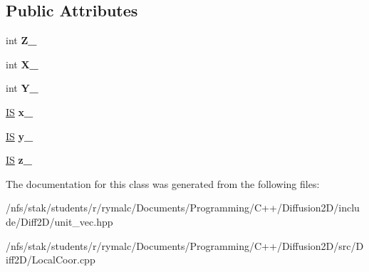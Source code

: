 \subsection*{Public Attributes}
\begin{DoxyCompactItemize}
\item 
\hypertarget{classLocalCoor_acd97c2eb7e3b994dbc58ae98ab785280}{
int {\bfseries Z\_\-}}
\label{classLocalCoor_acd97c2eb7e3b994dbc58ae98ab785280}

\item 
\hypertarget{classLocalCoor_a7d72e3489aaf1b6579f7a3e0f5b30e26}{
int {\bfseries X\_\-}}
\label{classLocalCoor_a7d72e3489aaf1b6579f7a3e0f5b30e26}

\item 
\hypertarget{classLocalCoor_a5ff6668d5d6898582ddfdc5eadce58ff}{
int {\bfseries Y\_\-}}
\label{classLocalCoor_a5ff6668d5d6898582ddfdc5eadce58ff}

\item 
\hypertarget{classLocalCoor_a2c0e974fc45c597f893b20a0c2f6869c}{
\hyperlink{structIS}{IS} {\bfseries x\_\-}}
\label{classLocalCoor_a2c0e974fc45c597f893b20a0c2f6869c}

\item 
\hypertarget{classLocalCoor_a58678d9cfb17db349a9d7fd70a2d5150}{
\hyperlink{structIS}{IS} {\bfseries y\_\-}}
\label{classLocalCoor_a58678d9cfb17db349a9d7fd70a2d5150}

\item 
\hypertarget{classLocalCoor_acdd6d24c450a43fd755f2e43d16d9991}{
\hyperlink{structIS}{IS} {\bfseries z\_\-}}
\label{classLocalCoor_acdd6d24c450a43fd755f2e43d16d9991}

\end{DoxyCompactItemize}


The documentation for this class was generated from the following files:\begin{DoxyCompactItemize}
\item 
/nfs/stak/students/r/rymalc/Documents/Programming/C++/Diffusion2D/include/Diff2D/unit\_\-vec.hpp\item 
/nfs/stak/students/r/rymalc/Documents/Programming/C++/Diffusion2D/src/Diff2D/LocalCoor.cpp\end{DoxyCompactItemize}

